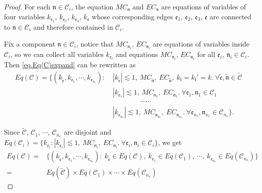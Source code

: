 \begin{proof}
For each $\mathfrak{n}\in\mathcal{C}_i$, the equation $MC_{\mathfrak{n}}$ and  $EC_{\mathfrak{n}}$ are equations of variables of four variables $k_{\mathfrak{e}_1}$, $k_{\mathfrak{e}_2}$, $k_{\mathfrak{e}_3}$, $k_{\mathfrak{e}}$ whose corresponding edges $\mathfrak{e}_1$, $\mathfrak{e}_2$, $\mathfrak{e}_3$, $\mathfrak{e}$ are connected to $\mathfrak{n}\in\mathcal{C}_i$ and therefore contained in $\mathcal{C}_i$.

Fix a component $\mathfrak{n}\in\mathcal{C}_i$, notice that $MC_{\mathfrak{n}_i}$, $EC_{\mathfrak{n}_i}$ are equations of variables inside $\mathcal{C}_i$, so we can collect all variables $k_{\mathfrak{e}_i}$ and equations $MC_{\mathfrak{n}_i}$, $EC_{\mathfrak{n}_i}$ for all $\mathfrak{e}_i$, $\mathfrak{n}_i\in \mathcal{C}_i$. Then \eqref{eq.Eq(C)expand} can be rewritten as 
\begin{equation}\label{eq.Eq(C)expand'}
\begin{split}
    Eq(\mathcal{C})=\{(k_{\widetilde{\mathfrak{e}}},k_{\mathfrak{e}_1},\cdots,k_{\mathfrak{e}_{n_c}}):&\ |k_{\widetilde{\mathfrak{e}}}| \lesssim 1,\ MC_{\widetilde{\mathfrak{n}}},\ EC_{\widetilde{\mathfrak{n}}},\  k_{\mathfrak{l}}=k_{\mathfrak{l}}'=k.\ \forall \widetilde{\mathfrak{e}}, \widetilde{\mathfrak{n}}\in\widetilde{\mathcal{C}}
    \\
    &\ |k_{\mathfrak{e}_1}| \lesssim 1,\ MC_{\mathfrak{n}_1},\ EC_{\mathfrak{n}_1}.\ \forall \mathfrak{e}_1, \mathfrak{n}_1\in\mathcal{C}_1
    \\
    &\ \qquad\qquad\cdots\cdots
    \\
    &\ |k_{\mathfrak{e}_{n_c}}| \lesssim 1,\ MC_{\mathfrak{n}_{n_c}},\ EC_{\mathfrak{n}_{n_c}}.\ \forall \mathfrak{e}_{n_c}, \mathfrak{n}_{n_c}\in\mathcal{C}_{n_c}\}.
\end{split}
\end{equation}

Since $\widetilde{\mathcal{C}}$, $\mathcal{C}_{1}$, $\cdots $, $\mathcal{C}_{n_c}$ are disjoint and $Eq(\mathcal{C}_{i})=\{k_{\mathfrak{e}_i}:|k_{\mathfrak{e}_i}| \lesssim 1,\ MC_{\mathfrak{n}_i},\ EC_{\mathfrak{n}_i}.\ \forall \mathfrak{e}_i, \mathfrak{n}_i\in\mathcal{C}_i\}$, we get
\begin{equation}\label{eq.Eq(C)expand''}
\begin{split}
    Eq(\mathcal{C})=&\{(k_{\widetilde{\mathfrak{e}}},k_{\mathfrak{e}_1},\cdots,k_{\mathfrak{e}_{n_c}}):\ k_{\widetilde{\mathfrak{e}}}\in Eq(\mathcal{C}),\ k_{\mathfrak{e}_1}\in Eq(\mathcal{C}_1),\ \cdots,\ k_{\mathfrak{e}_{n_c}}\in Eq(\mathcal{C}_{n_c})\}
    \\
    =&Eq(\widetilde{\mathcal{C}})\times Eq(\mathcal{C}_{1})\times\cdots\times Eq(\mathcal{C}_{n_c})
\end{split}
\end{equation}



\end{proof}
